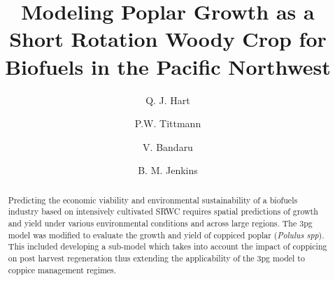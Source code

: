\documentclass[preprint,12pt]{elsarticle}
\begin{document}
\begin{frontmatter}



\title{Modeling Poplar Growth as a Short Rotation Woody Crop for Biofuels in the Pacific Northwest}


\author[lawr]{Q. J. Hart}
\author[cf]{P.W. Tittmann}
\author[bioag]{V. Bandaru}
\author[bioag]{B. M. Jenkins}

\address{Department of Land, Air, and Water, University of California, Davis, USA}
\address{Center for Forestry, University of California, Berkeley, USA}
\address{Department of Biological and Agricultural Engineering, University of California, Davis, USA}

\begin{abstract}
  Predicting the economic viability and environmental sustainability
  of a biofuels industry based on intensively cultivated \acf{SRWC} requires spatial
  predictions of growth and yield under various
  environmental conditions and across large regions.  The \acf{3pg}
  model was modified to evaluate the growth and yield of coppiced
  poplar (\emph{Polulus spp}).  This included developing a sub-model 
  which takes into account the impact of coppicing on post harvest
  regeneration thus extending the applicability of the \acf{3pg} model
  to coppice management regimes.


\end{abstract}
\end{frontmatter}
\end{document}
